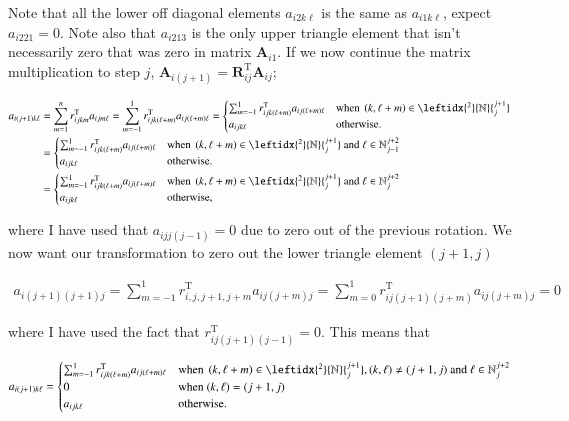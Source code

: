 \documentclass[11pt,english,a4paper]{article}
\begin{document}
\begin{flushleft}
Note that all the lower off diagonal elements  $a_{i2k\ell}$ is the same as $a_{i1k\ell}$, expect $a_{i221} = 0$. Note also that $a_{i213}$ is the only upper triangle element that isn't necessarily zero that was zero in matrix $\textbf{A}_{i1}$. If we now continue the matrix multiplication to step $j$, $\textbf{A}_{i(j+1)} = \textbf{R}_{ij}^{\text{T}} \textbf{A}_{ij}$;

\begin{align*}
a_{i(j+1)k\ell} &= \sum_{m=1}^n r_{ijkm}^{\text{T}} a_{ijm\ell} = \sum_{m=-1}^1 r_{ijk(\ell+m)}^{\text{T}} a_{ij(\ell+m)\ell} 
= \begin{cases} \sum_{m=-1}^1 r_{ijk(\ell+m)}^{\text{T}} a_{ij(\ell+m)\ell} & \text{when } \p{k,\ell+m}\in{\leftidx{^2}{\mathbb{N}}{_j^{j+1}}}\\ a_{ijk\ell} & \text{otherwise.}\end{cases}
\\
&= \begin{cases} \sum_{m=-1}^1 r_{ijk(\ell+m)}^{\text{T}} a_{ij(\ell+m)\ell} & \text{when } \p{k,\ell+m}\in{\leftidx{^2}{\mathbb{N}}{_j^{j+1}}} \text{ and } \ell \in\mathbb{N}_{j-1}^{j+2}\\ a_{ijk\ell} & \text{otherwise.}\end{cases}
\\
&= \begin{cases} \sum_{m=-1}^1 r_{ijk(\ell+m)}^{\text{T}} a_{ij(\ell+m)\ell} & \text{when } \p{k,\ell+m}\in{\leftidx{^2}{\mathbb{N}}{_j^{j+1}}} \text{ and } \ell \in\mathbb{N}_{j}^{j+2}\\ a_{ijk\ell} & \text{otherwise,}\end{cases}
\end{align*}

where I have used that $a_{ijj(j-1)}=0$ due to zero out of the previous rotation. We now want our transformation to zero out the lower triangle element $(j+1,j)$

\begin{align*}
a_{i(j+1)(j+1)j} = \sum_{m=-1}^1 r_{i,j,j+1,j+m}^{\text{T}} a_{ij(j+m)j} = \sum_{m=0}^1 r_{ij(j+1)(j+m)}^{\text{T}} a_{ij(j+m)j} = 0
\end{align*}

where I have used the fact that $r_{ij(j+1)(j-1)}^{\text{T}} = 0$. This means that

\begin{align}
a_{i(j+1)k\ell} = \begin{cases} \sum_{m=-1}^1 r_{ijk(\ell+m)}^{\text{T}} a_{ij(\ell+m)\ell} & \text{when } \p{k,\ell+m}\in{\leftidx{^2}{\mathbb{N}}{_j^{j+1}}}, (k,\ell)\neq (j+1,j) \text{ and } \ell \in\mathbb{N}_{j}^{j+2}\\ 0 & \text{when } (k,\ell)=(j+1,j) \\ a_{ijk\ell} & \text{otherwise.}\end{cases} 
\label{eq_23}
\end{align}


\end{flushleft}
\end{document}
